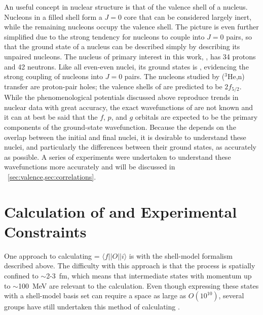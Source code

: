 An useful concept in nuclear structure is that of the valence shell of a nucleus.  Nucleons in a filled shell form a $J=0$ core that can be considered largely inert, while the remaining nucleons occupy the valence shell.  The picture is even further simplified due to the strong tendency for nucleons to couple into $J=0$ pairs, so that the ground state of a nucleus can be described simply by describing its unpaired nucleons.  The nucleus of primary interest in this work, , has 34 protons and 42 neutrons.  Like all even-even nuclei, its ground states is \zp, evidencing the strong coupling of nucleons into $J=0$ pairs.  The nucleons studied by ($^3$He,n) transfer are proton-pair holes; the valence shells of \GeTargets are predicted to be $2f_{5/2}$.  While the phenomenological potentials discussed above reproduce trends in nuclear data with great accuracy, the exact wavefunctions of \GeTargets are not known and it can at best be said that the $f$, $p$, and $g$ orbitals are expected to be the primary components of the ground-state wavefunction.  Because the \NME depends on the overlap between the initial and final nuclei, it is desirable to understand these nuclei, and particularly the differences between their ground states, as accurately as possible.  A series of experiments were undertaken to understand these wavefunctions more accurately and will be discussed in {\sect}~\ref{sec:valence,sec:correlations}.

\section{Calculation of \NME and Experimental Constraints}

One approach to calculating \NME = $\langle f||O||i \rangle$ is with the shell-model formalism described above.  The difficulty with this approach is that the \zvbb process is spatially confined to $\sim$2-3~fm, which means that intermediate states with momentum up to $\sim$100~MeV \cite{anatomy} are relevant to the calculation.  Even though expressing these states with a shell-model basis set can require a space as large as $O(10^{10})$,  several groups have still undertaken this method of calculating \NME \cite{CaurierShellModel}.  


